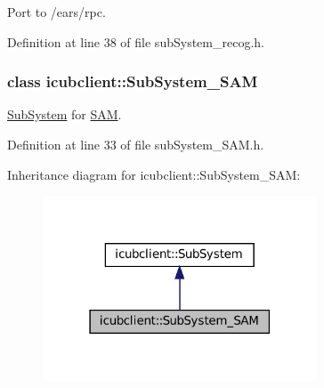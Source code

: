 Port to /ears/rpc. 



Definition at line 38 of file sub\+System\+\_\+recog.\+h.

\label{classicubclient_1_1SubSystem__SAM}
\subsubsection{class icubclient\+:\+:Sub\+System\+\_\+\+S\+AM}
\hyperlink{group__icubclient__subsystems_classicubclient_1_1SubSystem}{Sub\+System} for \hyperlink{namespaceSAM}{S\+AM}. 

Definition at line 33 of file sub\+System\+\_\+\+S\+A\+M.\+h.



Inheritance diagram for icubclient\+:\+:Sub\+System\+\_\+\+S\+AM\+:
\nopagebreak
\begin{figure}[H]
\begin{center}
\leavevmode
\includegraphics[width=231pt]{classicubclient_1_1SubSystem__SAM__inherit__graph}
\end{center}
\end{figure}
